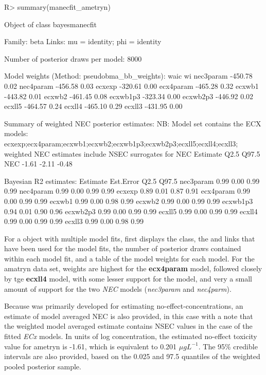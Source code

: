 \documentclass[
  shortnames]{jss}
\begin{document}
\begin{CodeChunk}
\begin{CodeInput}
R> summary(manecfit_ametryn)
\end{CodeInput}
\begin{CodeOutput}
Object of class bayesmanecfit

 Family: beta  
  Links: mu = identity; phi = identity  

Number of posterior draws per model:  8000

Model weights (Method: pseudobma_bb_weights):
             waic   wi
nec3param -450.78 0.02
nec4param -456.58 0.03
ecxexp    -320.61 0.00
ecx4param -465.28 0.32
ecxwb1    -443.82 0.01
ecxwb2    -461.45 0.08
ecxwb1p3  -323.34 0.00
ecxwb2p3  -446.92 0.02
ecxll5    -464.57 0.24
ecxll4    -465.10 0.29
ecxll3    -431.95 0.00


Summary of weighted NEC posterior estimates:
NB: Model set contains the ECX models: ecxexp;ecx4param;ecxwb1;ecxwb2;ecxwb1p3;ecxwb2p3;ecxll5;ecxll4;ecxll3; weighted NEC estimates include NSEC surrogates for NEC
    Estimate  Q2.5 Q97.5
NEC    -1.61 -2.11 -0.48


Bayesian R2 estimates:
          Estimate Est.Error Q2.5 Q97.5
nec3param     0.99      0.00 0.99  0.99
nec4param     0.99      0.00 0.99  0.99
ecxexp        0.89      0.01 0.87  0.91
ecx4param     0.99      0.00 0.99  0.99
ecxwb1        0.99      0.00 0.98  0.99
ecxwb2        0.99      0.00 0.99  0.99
ecxwb1p3      0.94      0.01 0.90  0.96
ecxwb2p3      0.99      0.00 0.99  0.99
ecxll5        0.99      0.00 0.99  0.99
ecxll4        0.99      0.00 0.99  0.99
ecxll3        0.99      0.00 0.98  0.99
\end{CodeOutput}
\end{CodeChunk}

For a  object with multiple model fits,  first displays the class, the  and links that have been used for the model fits, the number of posterior draws contained within each model fit, and a table of the model weights for each model. For the amatryn data set, weights are highest for the \textbf{ecx4param} model, followed closely by tge \textbf{ecxll4} model, with some lesser support for the  model, and very a small amount of support for the two \emph{NEC} models (\emph{nec3param} and \emph{nec4parm}).

Because  was primarily developed for estimating no-effect-concentrations, an estimate of model averaged NEC is also provided, in this case with a note that the weighted model averaged estimate contains NSEC \citep{Fisher2023} values in the case of the fitted \emph{ECx} models. In units of log concentration, the estimated no-effect toxicity value for ametryn is -1.61, which is equivalent to 0.201 \({\mu}gL^{-1}\). The 95\% credible intervals are also provided, based on the 0.025 and 97.5 quantiles of the weighted pooled posterior sample.
\end{document}
